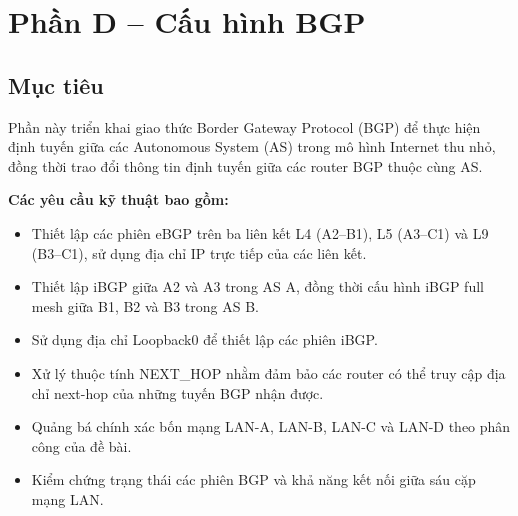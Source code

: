 

\section{Phần D -- Cấu hình BGP}


\subsection{Mục tiêu}

Phần này triển khai giao thức Border Gateway
Protocol (BGP) để thực hiện định tuyến giữa
các Autonomous System (AS) trong mô hình
Internet thu nhỏ, đồng thời trao đổi thông tin
định tuyến giữa các router BGP thuộc cùng AS.

\textbf{Các yêu cầu kỹ thuật bao gồm:}

\begin{itemize}

    \item Thiết lập các phiên eBGP trên
    ba liên kết L4 (A2--B1), L5 (A3--C1)
    và L9 (B3--C1), sử dụng địa chỉ IP
    trực tiếp của các liên kết.

    \item Thiết lập iBGP giữa A2 và A3
    trong AS A, đồng thời cấu hình
    iBGP full mesh giữa B1, B2 và B3
    trong AS B.

    \item Sử dụng địa chỉ Loopback0
    để thiết lập các phiên iBGP.

    \item Xử lý thuộc tính NEXT\_HOP
    nhằm đảm bảo các router có thể
    truy cập địa chỉ next-hop của
    những tuyến BGP nhận được.

    \item Quảng bá chính xác bốn mạng
    LAN-A, LAN-B, LAN-C và LAN-D
    theo phân công của đề bài.

    \item Kiểm chứng trạng thái các
    phiên BGP và khả năng kết nối
    giữa sáu cặp mạng LAN.

\end{itemize}



